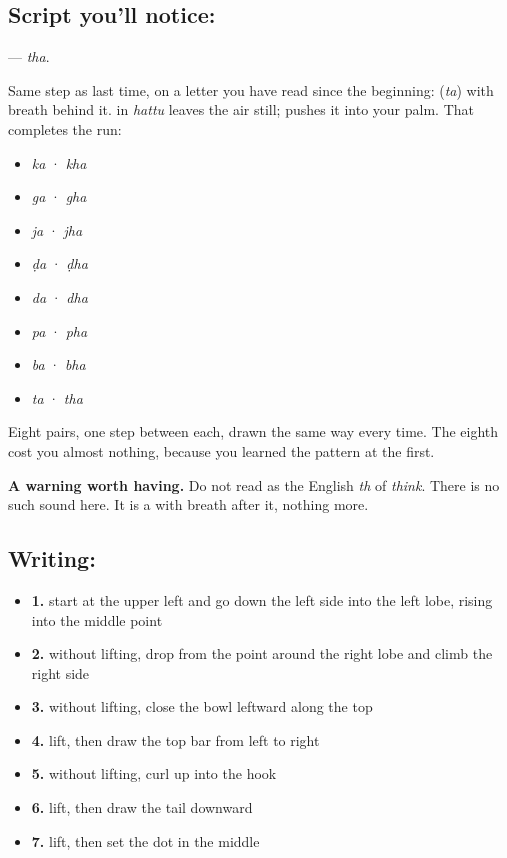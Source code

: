 \subsection*{Script you'll notice: }
\textbf{} — \emph{tha}.

Same step as last time, on a letter you have read since the beginning: \textbf{} (\emph{ta}) with breath behind it. \textbf{} in \textbf{} \emph{hattu} leaves the air still; \textbf{} pushes it into your palm. That completes the run:

\begin{itemize}
\raggedright
  \item \textbf{} \emph{ka} · \textbf{} \emph{kha}
  \item \textbf{} \emph{ga} · \textbf{} \emph{gha}
  \item \textbf{} \emph{ja} · \textbf{} \emph{jha}
  \item \textbf{} \emph{ḍa} · \textbf{} \emph{ḍha}
  \item \textbf{} \emph{da} · \textbf{} \emph{dha}
  \item \textbf{} \emph{pa} · \textbf{} \emph{pha}
  \item \textbf{} \emph{ba} · \textbf{} \emph{bha}
  \item \textbf{} \emph{ta} · \textbf{} \emph{tha}
\end{itemize}

Eight pairs, one step between each, drawn the same way every time. The eighth cost you almost nothing, because you learned the pattern at the first.

\textbf{A warning worth having.} Do not read \textbf{} as the English \emph{th} of \emph{think}. There is no such sound here. It is a \textbf{} with breath after it, nothing more.

\subsection*{Writing: }

\begin{itemize}
\raggedright
  \item \textbf{1.} start at the upper left and go down the left side into the left lobe, rising into the middle point
  \item \textbf{2.} without lifting, drop from the point around the right lobe and climb the right side
  \item \textbf{3.} without lifting, close the bowl leftward along the top
  \item \textbf{4.} lift, then draw the top bar from left to right
  \item \textbf{5.} without lifting, curl up into the hook
  \item \textbf{6.} lift, then draw the tail downward
  \item \textbf{7.} lift, then set the dot in the middle
\end{itemize}

